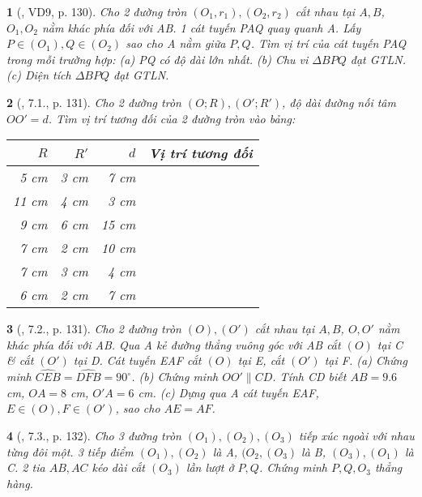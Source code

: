 \documentclass{article}
\newtheorem{baitoan}{}
\begin{document}
\begin{baitoan}[\cite{Binh_boi_duong_Toan_9_tap_1}, VD9, p. 130]
	Cho 2 đường tròn $(O_1,r_1),(O_2,r_2)$ cắt nhau tại $A,B$, $O_1,O_2$ nằm khác phía đối với AB. 1 cát tuyến PAQ quay quanh A. Lấy $P\in(O_1),Q\in(O_2)$ sao cho A nằm giữa $P,Q$. Tìm vị trí của cát tuyến PAQ trong mỗi trường hợp: (a) PQ có độ dài lớn nhất. (b) Chu vi $\Delta BPQ$ đạt {\rm GTLN}. (c) Diện tích $\Delta BPQ$ đạt {\rm GTLN}.
\end{baitoan}

\begin{baitoan}[\cite{Binh_boi_duong_Toan_9_tap_1}, 7.1., p. 131]
	Cho 2 đường tròn $(O;R),(O';R')$, độ dài đường nối tâm $OO' = d$. Tìm vị trí tương đối của 2 đường tròn vào bảng:
	\begin{table}[H]
		\centering
		\begin{tabular}{|r|r|r|c|}
			\hline
			$R$ & $R'$ & $d$ & Vị trí tương đối \\
			\hline
			5 cm & 3 cm & 7 cm &  \\
			\hline
			11 cm & 4 cm & 3 cm &  \\
			\hline
			9 cm & 6 cm & 15 cm &  \\
			\hline
			7 cm & 2 cm & 10 cm &  \\
			\hline
			7 cm & 3 cm & 4 cm &  \\
			\hline
			6 cm & 2 cm & 7 cm &  \\
			\hline
		\end{tabular}
	\end{table}
\end{baitoan}

\begin{baitoan}[\cite{Binh_boi_duong_Toan_9_tap_1}, 7.2., p. 131]
	Cho 2 đường tròn $(O),(O')$ cắt nhau tại $A,B$, $O,O'$ nằm khác phía đối với AB. Qua A kẻ đường thẳng vuông góc với AB cắt $(O)$ tại C \& cắt $(O')$ tại D. Cát tuyến EAF cắt $(O)$ tại E, cắt $(O')$ tại F. (a) Chứng minh $\widehat{CEB} = \widehat{DFB} = 90^\circ$. (b) Chứng minh $OO'\parallel CD$. Tính CD biết $AB = 9.6$ {\rm cm}, $OA = 8$  {\rm cm}, $O'A = 6$ {\rm cm}. (c) Dựng qua A cát tuyến EAF, $E\in(O),F\in(O')$, sao cho $AE = AF$.
\end{baitoan}

\begin{baitoan}[\cite{Binh_boi_duong_Toan_9_tap_1}, 7.3., p. 132]
	Cho 3 đường tròn $(O_1),(O_2),(O_3)$ tiếp xúc ngoài với nhau từng đôi một. 3 tiếp điểm $(O_1),(O_2)$ là A, $(O_2,(O_3)$ là B, $(O_3),(O_1)$ là C. 2 tia $AB,AC$ kéo dài cắt $(O_3)$ lần lượt ở $P,Q$. Chứng minh $P,Q,O_3$ thẳng hàng.
\end{baitoan}
\end{document}
